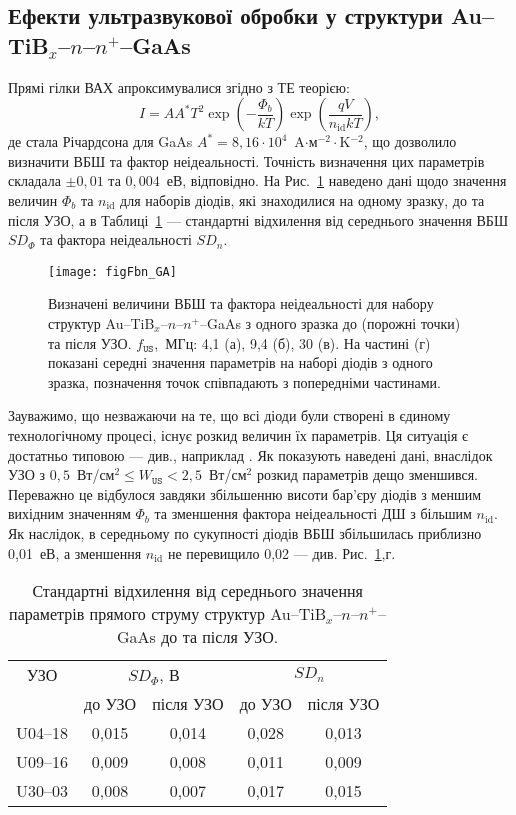 \subsection{Ефекти ультразвукової обробки у структури Au--TiB$_x$--$n$--$n^+$--GaAs}

Прямі гілки ВАХ апроксимувалися згідно з ТЕ теорією:
\begin{equation}\label{eqIVGAMS}
  I=AA^*T^2\exp\left(-\frac{\Phi_b}{kT}\right)\exp\left(\frac{qV}{n_\mathrm{id}kT}\right),
\end{equation}
де стала Річардсона для GaAs $A^*=8,16\cdot10^4$~A$\cdot$м$^{-2}\cdot$K$^{-2}$,
що дозволило визначити ВБШ та фактор неідеальності.
Точність визначення цих параметрів складала $\pm0,01$ та $0,004$~еВ, відповідно.
На Рис.~\ref{figFbn_GA} наведено дані щодо значення величин $\Phi_b$ та $n_\mathrm{id}$
для наборів діодів, які знаходилися на одному зразку, до та після УЗО,
а в Таблиці~\ref{tabUS_GaAsForv} --- стандартні відхилення від середнього значення ВБШ $SD_\Phi$ та фактора неідеальності $SD_n$.



\begin{figure}
\center
\texttt{[image: figFbn\_GA]}%
\caption{\label{figFbn_GA}
Визначені величини ВБШ та фактора неідеальності для набору структур Au--TiB$_x$--$n$--$n^+$--GaAs
з одного зразка до (порожні точки) та після УЗО.
$f_\mathtt{US}$,~МГц: 4,1 (а), 9,4 (б), 30 (в).
На частині (г) показані середні значення параметрів на наборі діодів з одного зразка,
позначення точок співпадають з попередніми частинами.
}
\end{figure}

Зауважимо, що незважаючи на те, що всі діоди були створені в єдиному технологічному процесі,
існує розкид величин їх параметрів.
Ця ситуація є достатньо типовою --- див., наприклад \cite{SBD:rizn,Milenin1994}.
Як показують наведені дані, внаслідок УЗО з $0,5$~Вт/см$^2\leq W_\mathtt{US}<2,5$~Вт/см$^2$
розкид параметрів дещо зменшився.
Переважно це відбулося завдяки збільшенню висоти бар'єру діодів з меншим вихідним значенням $\Phi_b$ та
зменшення фактора неідеальності ДШ з більшим $n_\mathrm{id}$.
Як наслідок, в середньому по сукупності діодів ВБШ збільшилась приблизно 0,01~еВ, а зменшення $n_\mathrm{id}$ не
перевищило 0,02 --- див. Рис.~\ref{figFbn_GA},г.

\begin{table}
\caption{\label{tabUS_GaAsForv}Стандартні відхилення від середнього значення параметрів прямого струму структур Au--TiB$_x$--$n$--$n^+$--GaAs до та після УЗО.
}
\center
\begin{tabular}{|c|c|c|c|c|}
\hline
УЗО&\multicolumn{2}{c|}{$SD_\Phi$, В}&\multicolumn{2}{c|}{$SD_n$}\\ \cline{2-5}
& до УЗО & після УЗО & до УЗО & після УЗО\\
\hline
U04--18&0,015&0,014&0,028&0,013\\ \hline
U09--16&0,009&0,008&0,011&0,009\\ \hline
U30--03&0,008&0,007&0,017&0,015\\ \hline
\end{tabular}
\end{table}


